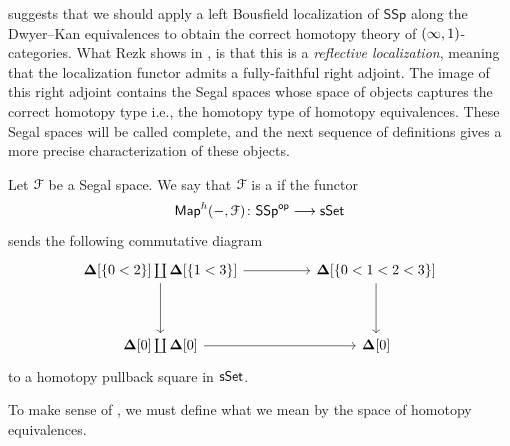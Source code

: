  suggests that we should apply a left Bousfield
localization of $\mathsf{SSp}$ along the Dwyer--Kan equivalences to obtain the
correct homotopy theory of $(\operatorname{\infty},1)$-categories. What Rezk shows in
\cite{Rezk01}, is that this is a \emph{reflective localization}, meaning that
the localization functor admits a fully-faithful right adjoint. The image of
this right adjoint contains the Segal spaces whose space of objects captures
the correct homotopy type i.e., the homotopy type of homotopy equivalences.
These Segal spaces will be called complete, and the next sequence of
definitions gives a more precise characterization of these objects.

\begin{definition}\label{ch2:: def: complete Segal}
    Let $\mathcal F$ be a Segal space. We say that $\mathcal F$ is a  if the functor
    \begin{equation}
        \operatorname{{\sf Map}}^{h}(-, \mathcal F) \colon \mathsf{SSp}^{\mathsf{op}} \longrightarrow \operatorname{\sf sSet}
    \end{equation}
    sends the following commutative diagram 
    \begin{equation}
        \label{eq complete}
        \begin{tikzcd}[ampersand replacement=\&]
        {\bDelta[\{0<2\}] \coprod \bDelta[\{1<3\}]} \&\& {\bDelta[\{0<1<2<3\}]} \\
        \\
        {\bDelta[0] \coprod\bDelta[0]} \&\& {\bDelta[0]}
        \arrow[from=1-1, to=1-3]
        \arrow[from=1-1, to=3-1]
        \arrow[from=1-3, to=3-3]
        \arrow[from=3-1, to=3-3]
    \end{tikzcd}
    \end{equation}
    to a homotopy pullback square in $\operatorname{\sf sSet}$.
\end{definition}

To make sense of , we must define what we mean by the space of homotopy equivalences. 


